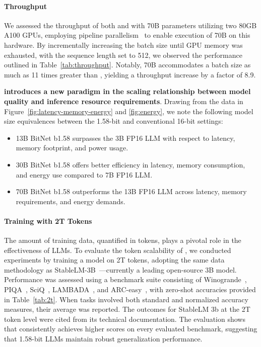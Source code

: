 \paragraph{Throughput}

We assessed the throughput of both  and  with 70B parameters utilizing two 80GB A100 GPUs, employing pipeline parallelism~\cite{gpipe} to enable execution of  70B on this hardware. By incrementally increasing the batch size until GPU memory was exhausted, with the sequence length set to 512, we observed the performance outlined in Table~\ref{tab:throughput}. Notably,  70B accommodates a batch size as much as 11 times greater than , yielding a throughput increase by a factor of 8.9.

\textbf{ introduces a new paradigm in the scaling relationship between model quality and inference resource requirements}. Drawing from the data in Figure~\ref{fig:latency-memory-energy} and \ref{fig:energy}, we note the following model size equivalences between the 1.58-bit and conventional 16-bit settings:

\begin{itemize}
    \item 13B BitNet b1.58 surpasses the 3B FP16 LLM with respect to latency, memory footprint, and power usage.
    \item 30B BitNet b1.58 offers better efficiency in latency, memory consumption, and energy use compared to 7B FP16 LLM.
    \item 70B BitNet b1.58 outperforms the 13B FP16 LLM across latency, memory requirements, and energy demands.
\end{itemize}

\paragraph{Training with 2T Tokens}

The amount of training data, quantified in tokens, plays a pivotal role in the effectiveness of LLMs. To evaluate the token scalability of , we conducted experiments by training a  model on 2T tokens, adopting the same data methodology as StableLM-3B~\cite{StableLM-3B-4E1T}—currently a leading open-source 3B model. Performance was assessed using a benchmark suite consisting of Winogrande~\cite{winoGrande}, PIQA~\cite{piqa}, SciQ~\cite{sciq}, LAMBADA~\cite{lambada}, and ARC-easy~\cite{arc}, with zero-shot accuracies provided in Table~\ref{tab:2t}. When tasks involved both standard and normalized accuracy measures, their average was reported. The outcomes for StableLM 3b at the 2T token level were cited from its technical documentation. The evaluation shows that  consistently achieves higher scores on every evaluated benchmark, suggesting that 1.58-bit LLMs maintain robust generalization performance.


